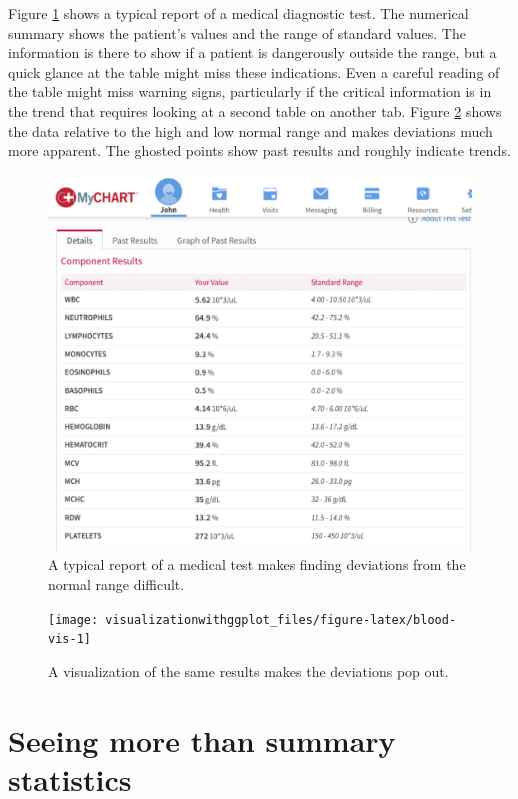 \documentclass[]{krantz}
\begin{document}
Figure \ref{fig:blood-tab} shows a typical report of a medical diagnostic test. The numerical summary shows the patient's values and the range of standard values. The information is there to show if a patient is dangerously outside the range, but a quick glance at the table might miss these indications. Even a careful reading of the table might miss warning signs, particularly if the critical information is in the trend that requires looking at a second table on another tab. Figure \ref{fig:blood-vis} shows the data relative to the high and low normal range and makes deviations much more apparent. The ghosted points show past results and roughly indicate trends.

\begin{figure}
\includegraphics[width=79.25in]{images/Blood_table} \caption{A typical report of a medical test makes finding deviations from the normal range difficult.}\label{fig:blood-tab}
\end{figure}

\begin{figure}
\texttt{[image: visualizationwithggplot\_files/figure-latex/blood-vis-1]} \caption{A visualization of the same results makes the deviations pop out.}\label{fig:blood-vis}
\end{figure}

\hypertarget{seeing-more-than-summary-statistics}{%
\section{Seeing more than summary statistics}\label{seeing-more-than-summary-statistics}}
\end{document}
